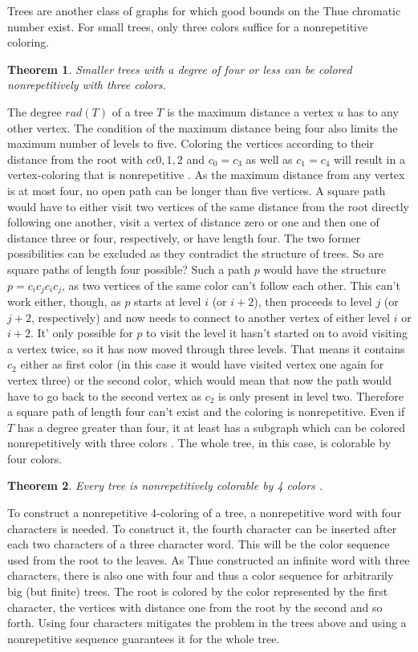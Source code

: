 \documentclass[12pt,a4paper]{article}
\newtheorem{theorem}{Theorem}
\begin{document}
Trees are another class of graphs for which good bounds on the Thue chromatic number exist. For small trees, only three colors suffice for a nonrepetitive coloring.
\begin{theorem}
Smaller trees with a degree of four or less can be colored nonrepetitively with three colors. \citep{Bresar2007}
\end{theorem} 
The degree $rad(T)$ of a tree $T$ is the maximum distance a vertex $u$ has to any other vertex. The condition of the maximum distance being four also limits the maximum number of levels to five. Coloring the vertices according to their distance from the root with $c \epsilon {0, 1, 2}$ and $c_0 = c_3$ as well as $c_1 = c_4$ will result in a vertex-coloring that is nonrepetitive \citep{Bresar2007}. As the maximum distance from any vertex is at most four, no open path can be longer than five vertices. A square path would have to either visit two vertices of the same distance from the root directly following one another, visit a vertex of distance zero or one and then one of distance three or four, respectively, or have length four. The two former possibilities can be excluded as they contradict the structure of trees. So are square paths of length four possible? Such a path $p$ would have the structure $p=c_ic_jc_ic_j$, as two vertices of the same color can't follow each other. This can't work either, though, as $p$ starts at level $i$ (or $i+2$), then proceeds to level $j$ (or $j+2$, respectively) and now needs to connect to another vertex of either level $i$ or $i+2$. It' only possible for $p$ to visit the level it hasn't started on to avoid visiting a vertex twice, so it has now moved through three levels. That means it contains $c_2$ either as first color (in this case it would have visited vertex one again for vertex three) or the second color, which would mean that now the path would have to go back to the second vertex as $c_2$ is only present in level two. Therefore a square path of length four can't exist and the coloring is nonrepetitive.
\newline
\newline
Even if $T$ has a degree greater than four, it at least has a subgraph which can be colored nonrepetitively with three colors \citep{Bresar2007}. The whole tree, in this case, is colorable by four colors.
\begin{theorem}
Every tree is nonrepetitively colorable by 4 colors \citep{Bresar2007}.
\end{theorem} 
To construct a nonrepetitive 4-coloring of a tree, a nonrepetitive word with four characters is needed. To construct it, the fourth character can be inserted after each two characters of a three character word. This will be the color sequence used from the root to the leaves. As Thue constructed an infinite word with three characters, there is also one with four and thus a color sequence for arbitrarily big (but finite) trees. The root is colored by the color represented by the first character, the vertices with distance one from the root by the second and so forth. Using four characters mitigates the problem in the trees above and using a nonrepetitive sequence guarantees it for the whole tree.
\end{document}
